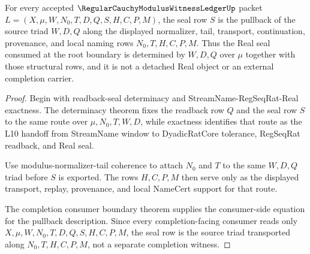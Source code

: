 \begin{theorem}
\label{thm:regular-cauchy-modulus-witness-ledger-seal-source-pullback}
For every accepted $\RegularCauchyModulusWitnessLedgerUp$ packet $L=(X,\mu,W,N_0,T,D,Q,S,H,C,P,M)$, the seal row $S$ is the pullback of the source triad $W,D,Q$ along the displayed normalizer, tail, transport, continuation, provenance, and local naming rows $N_0,T,H,C,P,M$. Thus the Real seal consumed at the root boundary is determined by $W,D,Q$ over $\mu$ together with those structural rows, and it is not a detached Real object or an external completion carrier.
\end{theorem}
\begin{proof}
Begin with readback-seal determinacy and StreamName-RegSeqRat-Real exactness. The determinacy theorem fixes the readback row $Q$ and the seal row $S$ to the same route over $\mu,N_0,T,W,D$, while exactness identifies that route as the L10 handoff from StreamName window to DyadicRatCore tolerance, RegSeqRat readback, and Real seal.

Use modulus-normalizer-tail coherence to attach $N_0$ and $T$ to the same $W,D,Q$ triad before $S$ is exported. The rows $H,C,P,M$ then serve only as the displayed transport, replay, provenance, and local NameCert support for that route.

The completion consumer boundary theorem supplies the consumer-side equation for the pullback description. Since every completion-facing consumer reads only $X,\mu,W,N_0,T,D,Q,S,H,C,P,M$, the seal row is the source triad transported along $N_0,T,H,C,P,M$, not a separate completion witness.
\end{proof}


